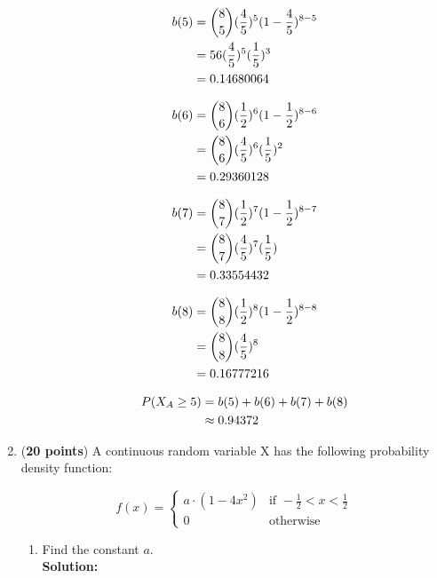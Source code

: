 \documentclass[a4paper]{article}
\begin{document}
\begin{enumerate}
\begin{enumerate}
\begin{align}
	b(5) &= {8 \choose 5}(\frac{4}{5})^5(1 - \frac{4}{5})^{8 - 5}\notag\\
	&= 56 (\frac{4}{5})^5(\frac{1}{5})^3\notag\\
	&= 0.14680064\notag
\end{align}

\begin{align}
	b(6) &= {8 \choose 6}(\frac{1}{2})^6(1 - \frac{1}{2})^{8 - 6}\notag\\
	&= {8 \choose 6}(\frac{4}{5})^6(\frac{1}{5})^2\notag\\
	&= 0.29360128\notag
\end{align}
	
	
\begin{align}
	b(7) &= {8 \choose 7}(\frac{1}{2})^7(1 - \frac{1}{2})^{8 - 7}\notag\\
	&= {8 \choose 7}(\frac{4}{5})^7(\frac{1}{5})\notag\\
	&= 0.33554432\notag
\end{align}


\begin{align}
	b(8) &= {8 \choose 8}(\frac{1}{2})^8(1 - \frac{1}{2})^{8 - 8}\notag\\
	&= {8 \choose 8}(\frac{4}{5})^8\notag\\
	&= 0.16777216\notag
\end{align}

\begin{align}
	P(X_A \geq 5) &= b(5) + b(6) + b(7) + b(8) \notag\\
	&\approx 0.94372\notag
\end{align}	
	
\end{enumerate}


\item (\textbf{20 points}) A continuous random variable X has the following probability density function:


\[
 f(x) = 
  \begin{cases} 
   a \cdot (1 - 4x^2) & \text{if } -\frac{1}{2} < x < \frac{1}{2}\\
   0 & \text{otherwise}
  \end{cases}
\]




\begin{enumerate}
	\item Find the constant $a$.\\
	\textbf{Solution:}\\
	

\end{enumerate}
\end{enumerate}
\end{document}
